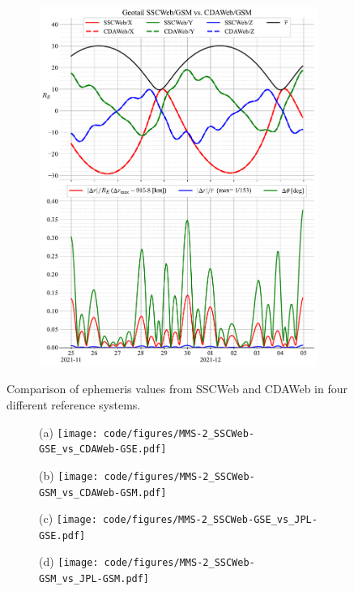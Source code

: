 \documentclass[draft]{agujournal2019}
\begin{document}
\begin{figure}[h]
\begin{subfigure}[b]{0.49\textwidth}
         \includegraphics[width=\textwidth]{figures/Geotail_SSCWeb-GSM_vs_CDAWeb-GSM.pdf}
     \end{subfigure}
     \caption{Comparison of ephemeris values from SSCWeb and CDAWeb in four different reference systems.}
     \label{fig:geotail}
\end{figure}

\clearpage

\begin{figure}[h]
     \begin{subfigure}[b]{0.49\textwidth}
         (a)
         \centering
         \texttt{[image: code/figures/MMS-2\_SSCWeb-GSE\_vs\_CDAWeb-GSE.pdf]}
     \end{subfigure}
     \begin{subfigure}[b]{0.49\textwidth}
         (b)
         \centering
         \texttt{[image: code/figures/MMS-2\_SSCWeb-GSM\_vs\_CDAWeb-GSM.pdf]}
     \end{subfigure}
     \par\bigskip\bigskip
     \begin{subfigure}[b]{0.49\textwidth}
         (c)
         \centering
         \texttt{[image: code/figures/MMS-2\_SSCWeb-GSE\_vs\_JPL-GSE.pdf]}
     \end{subfigure}
     \begin{subfigure}[b]{0.49\textwidth}
         (d)
         \centering
         \texttt{[image: code/figures/MMS-2\_SSCWeb-GSM\_vs\_JPL-GSM.pdf]}
     \end{subfigure}
     \caption{}
     \label{fig:mms-2}
\end{figure}
\end{document}
